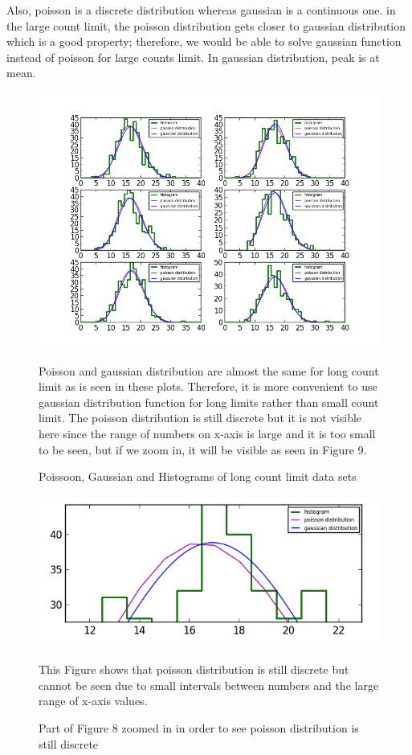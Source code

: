 \documentclass[letterpaper,12pt]{article}
\begin{document}
 Also, poisson is a discrete distribution whereas gaussian is a continuous one. in the large count limit, the poisson distribution gets closer to gaussian distribution which is a good property; therefore, we would be able to solve gaussian function instead of poisson for large counts limit. In gaussian distribution, peak is at mean.
 
 \begin{figure}
\centering
\includegraphics[scale=0.9]{poisson-gaussian-histograms-8-long.png}
\caption{Poissoon, Gaussian and Histograms of long count limit data sets}
Poisson and gaussian distribution are almost the same for long count limit as is seen in these plots. Therefore, it is more convenient to use gaussian distribution function for long limits rather than small count limit. The poisson distribution is still discrete but it is not visible here since the range of numbers on x-axis is large and it is too small to be seen, but if we zoom in, it will be visible as seen in Figure 9.
\end{figure}

\begin{figure}
\centering
\includegraphics[scale=0.9]{part8-long-zoomedin.png}
\caption{Part of Figure 8 zoomed in in order to see poisson distribution is still discrete}
This Figure shows that poisson distribution is still discrete but cannot be seen due to small intervals between numbers and the large range of x-axis values.
\end{figure}
 
\end{document}
